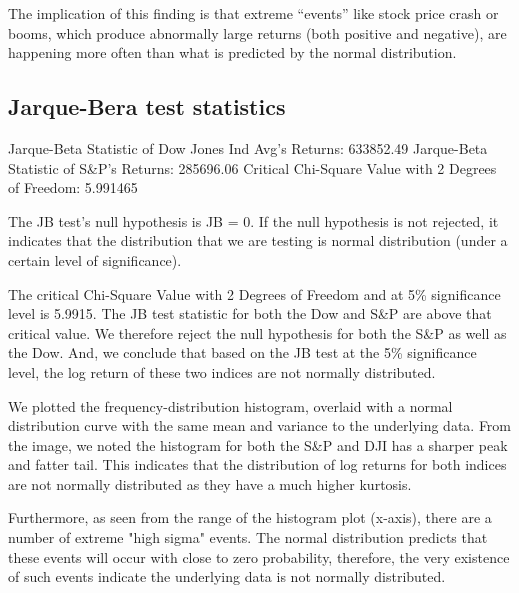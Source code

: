 \documentclass[a4paper]{article}
\begin{document}
	The implication of this finding is that extreme “events” like stock price crash or booms, which produce abnormally large returns (both positive and negative), are happening more often than what is predicted by the normal distribution.
	
	
	\subsection{Jarque-Bera test statistics}
	\begin{flushleft}
		Jarque-Beta Statistic of Dow Jones Ind Avg's Returns: 633852.49\linebreak
		Jarque-Beta Statistic of S\&P's Returns: 285696.06\linebreak
		Critical Chi-Square Value with 2 Degrees of Freedom: 5.991465\linebreak
	\end{flushleft}
	\vspace{-7mm}
	The JB test’s null hypothesis is JB = 0. If the null hypothesis is not rejected, it indicates that the distribution that we are testing is normal distribution (under a certain level of significance).  
	
	The critical Chi-Square Value with 2 Degrees of Freedom and at 5\% significance level is 5.9915. The JB test statistic for both the Dow and S\&P are above that critical value. We therefore reject the null hypothesis for both the S\&P as well as the Dow. And, we conclude that based on the JB test at the 5\% significance level, the log return of these two indices are not normally distributed.
	
	We plotted the frequency-distribution histogram, overlaid with a normal distribution curve with the same mean and variance to the underlying data. From the image, we noted the histogram for both the S\&P and DJI has a sharper peak and fatter tail. This indicates that the distribution of log returns for both indices are not normally distributed as they have a much higher kurtosis.
	
	Furthermore, as seen from the range of the histogram plot (x-axis), there are a number of extreme "high sigma" events. The normal distribution predicts that these events will occur with close to zero probability, therefore, the very existence of such events indicate the underlying data is not normally distributed. 
	
\end{document}
